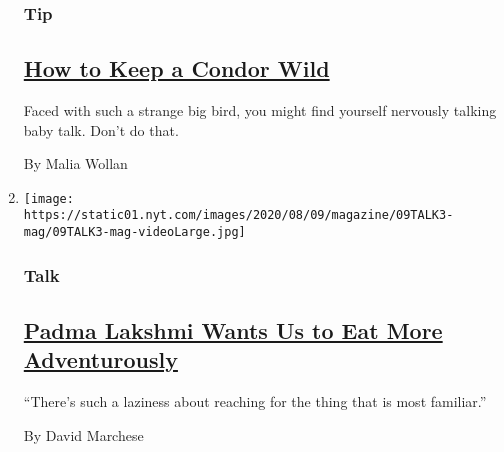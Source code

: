 \begin{enumerate}
  \hypertarget{tip}{%
  \subsubsection{Tip}\label{tip}}

  \hypertarget{how-to-keep-a-condor-wild}{%
  \subsection{\texorpdfstring{\href{/2020/08/04/magazine/condors-yurok-tribe.html}{How
  to Keep a Condor
  Wild}}{How to Keep a Condor Wild}}\label{how-to-keep-a-condor-wild}}

  Faced with such a strange big bird, you might find yourself nervously
  talking baby talk. Don't do that.

  By Malia Wollan
\item
  \texttt{[image: https://static01.nyt.com/images/2020/08/09/magazine/09TALK3-mag/09TALK3-mag-videoLarge.jpg]}

  \hypertarget{talk}{%
  \subsubsection{Talk}\label{talk}}

  \hypertarget{padma-lakshmi-wants-us-to-eat-more-adventurously}{%
  \subsection{\texorpdfstring{\href{/interactive/2020/08/03/magazine/padma-lakshmi-interview.html}{Padma
  Lakshmi Wants Us to Eat More
  Adventurously}}{Padma Lakshmi Wants Us to Eat More Adventurously}}\label{padma-lakshmi-wants-us-to-eat-more-adventurously}}

  ``There's such a laziness about reaching for the thing that is most
  familiar.''

  By David Marchese
\end{enumerate}

